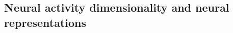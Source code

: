 \documentclass[5p,twocolumn,authoryear]{elsarticle}
\begin{document}
\clearpage
\subsection{Neural activity dimensionality and neural representations}
\label{sec_supp_repr}




\end{document}

